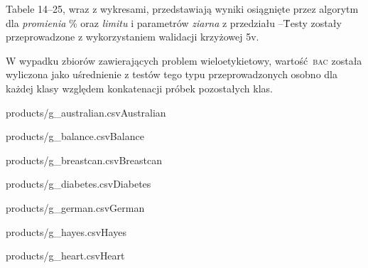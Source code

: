 \begin{table*}[htb]
    \parbox{.65\linewidth}{
    
	    Tabele 14--25, wraz z wykresami, przedstawiają wyniki osiągnięte przez algorytm dla \emph{promienia} \% oraz \emph{limitu}  i parametrów \emph{ziarna} z przedziału --\. Testy zostały przeprowadzone z wykorzystaniem walidacji krzyżowej \oldstylenums5v.
    	
    	W wypadku zbiorów zawierających problem wieloetykietowy, wartość \textsc{bac} została wyliczona jako uśrednienie z testów tego typu przeprowadzonych osobno dla każdej klasy względem konkatenacji próbek pozostałych klas.
    }\hfill
    \parbox{.32\linewidth}{
	    \begin{rideg}{products/g_australian.csv}{Australian}\end{rideg}
	}
\end{table*}

\begin{table*}[!ht]
    \parbox{.32\linewidth}{
	    \begin{rideg}{products/g_balance.csv}{Balance}\end{rideg}
	}
	\hfill
    \parbox{.32\linewidth}{
	    \begin{rideg}{products/g_breastcan.csv}{Breastcan}\end{rideg}
	}
	\hfill
    \parbox{.32\linewidth}{
	    \begin{rideg}{products/g_diabetes.csv}{Diabetes}\end{rideg}
	}
\end{table*}


\begin{table*}[!ht]
    \parbox{.32\linewidth}{
	    \begin{rideg}{products/g_german.csv}{German}\end{rideg}
	}
	\hfill
    \parbox{.32\linewidth}{
	    \begin{rideg}{products/g_hayes.csv}{Hayes}\end{rideg}
	}
	\hfill
    \parbox{.32\linewidth}{
	    \begin{rideg}{products/g_heart.csv}{Heart}\end{rideg}
	}
\end{table*}

